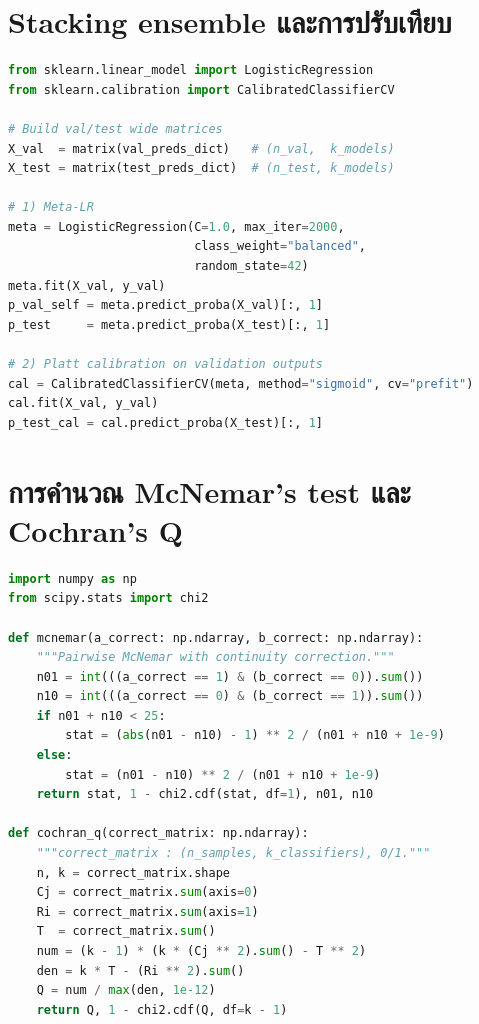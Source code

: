 \section{Stacking ensemble และการปรับเทียบ}
\begin{lstlisting}[language=Python,caption={scripts/train\_stacking.py (สาระสำคัญ)},label={lst:stacking}]
from sklearn.linear_model import LogisticRegression
from sklearn.calibration import CalibratedClassifierCV

# Build val/test wide matrices
X_val  = matrix(val_preds_dict)   # (n_val,  k_models)
X_test = matrix(test_preds_dict)  # (n_test, k_models)

# 1) Meta-LR
meta = LogisticRegression(C=1.0, max_iter=2000,
                          class_weight="balanced",
                          random_state=42)
meta.fit(X_val, y_val)
p_val_self = meta.predict_proba(X_val)[:, 1]
p_test     = meta.predict_proba(X_test)[:, 1]

# 2) Platt calibration on validation outputs
cal = CalibratedClassifierCV(meta, method="sigmoid", cv="prefit")
cal.fit(X_val, y_val)
p_test_cal = cal.predict_proba(X_test)[:, 1]
\end{lstlisting}

\section{การคำนวณ McNemar's test และ Cochran's Q}
\begin{lstlisting}[language=Python,caption={src/evaluation/stats\_tests.py},label={lst:stats}]
import numpy as np
from scipy.stats import chi2

def mcnemar(a_correct: np.ndarray, b_correct: np.ndarray):
    """Pairwise McNemar with continuity correction."""
    n01 = int(((a_correct == 1) & (b_correct == 0)).sum())
    n10 = int(((a_correct == 0) & (b_correct == 1)).sum())
    if n01 + n10 < 25:
        stat = (abs(n01 - n10) - 1) ** 2 / (n01 + n10 + 1e-9)
    else:
        stat = (n01 - n10) ** 2 / (n01 + n10 + 1e-9)
    return stat, 1 - chi2.cdf(stat, df=1), n01, n10

def cochran_q(correct_matrix: np.ndarray):
    """correct_matrix : (n_samples, k_classifiers), 0/1."""
    n, k = correct_matrix.shape
    Cj = correct_matrix.sum(axis=0)
    Ri = correct_matrix.sum(axis=1)
    T  = correct_matrix.sum()
    num = (k - 1) * (k * (Cj ** 2).sum() - T ** 2)
    den = k * T - (Ri ** 2).sum()
    Q = num / max(den, 1e-12)
    return Q, 1 - chi2.cdf(Q, df=k - 1)
\end{lstlisting}

